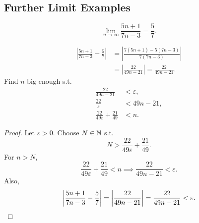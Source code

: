 \subsection{Further Limit Examples}

\begin{example}
  \[
    \lim_{n\to\infty}\frac{5n+1}{7n-3}=\frac57.
  \]
  \begin{thinking}
    \begin{align*}
      \left|\frac{5n+1}{7n-3}-\frac57\right|
       & =\left|\frac{7(5n+1)-5(7n-3)}{7(7n-3)}\right|      \\
       & =\left|\frac{22}{49n-21}\right|=\frac{22}{49n-21}.
    \end{align*}
    Find $n$ big enough s.t.
    \begin{align*}
      \frac{22}{49n-21}                      & <\varepsilon, \\
      \frac{22}{\varepsilon}                 & <49n-21,      \\
      \frac{22}{49\varepsilon}+\frac{21}{49} & <n.
    \end{align*}
  \end{thinking}
  \begin{proof}
    Let $\varepsilon>0$. Choose $N\in\mathbb{N}$ s.t.
    \[
      N>\frac{22}{49\varepsilon}+\frac{21}{49}.
    \]
    For $n>N$,
    \[
      \frac{22}{49\varepsilon}+\frac{21}{49}<n
      \implies\frac{22}{49n-21}<\varepsilon.
    \]
    Also,
    \[
      \left|\frac{5n+1}{7n-3}-\frac57\right|
      =\left|\frac{22}{49n-21}\right|
      =\frac{22}{49n-21}<\varepsilon.\qedhere
    \]
  \end{proof}
\end{example}

